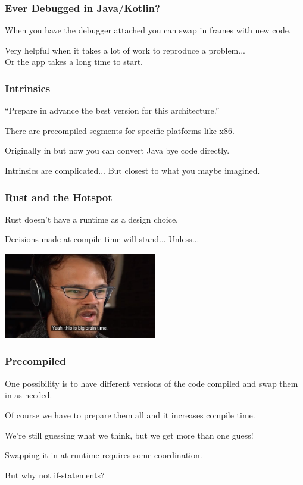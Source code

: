 \begin{frame}
\frametitle{Ever Debugged in Java/Kotlin?}

When you have the debugger attached you can swap in frames with new code.

Very helpful when it takes a lot of work to reproduce a problem...\\
\quad Or the app takes a long time to start.

\end{frame}


\begin{frame}
\frametitle{Intrinsics}

``Prepare in advance the best version for this architecture.''

There are precompiled segments for specific platforms like x86.

Originally in \CPP but now you can convert Java bye code directly. 

Intrinsics are complicated... But closest to what you maybe imagined.

\end{frame}


\begin{frame}
\frametitle{Rust and the Hotspot}

Rust doesn't have a runtime as a design choice.

Decisions made at compile-time will stand... Unless...

\begin{center}
	\includegraphics[width=0.5\textwidth]{images/bigbrain.jpg}
\end{center}

\end{frame}


\begin{frame}
\frametitle{Precompiled}

One possibility is to have different versions of the code compiled and swap them in as needed.

Of course we have to prepare them all and it increases compile time.

We're still guessing what we think, but we get more than one guess!

Swapping it in at runtime requires some coordination.

But why not if-statements?

\end{frame}

